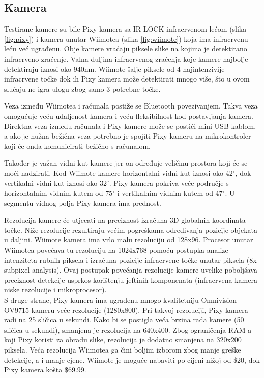 \documentclass[times, utf8, diplomski]{fer}
\begin{document}
\subsection{Kamera}
Testirane kamere su bile Pixy kamera sa IR-LOCK infracrvenom lećom (slika \ref{fig:pixy}) i kamera unutar Wiimotea (slika \ref{fig:wiimote}) koja ima infracrvenu leću već ugrađenu. Obje kamere vraćaju piksele slike na kojima je detektirano infracrveno zraćenje. Valna duljina infracrvenog zraćenja koje kamere najbolje detektiraju iznosi oko 940nm. Wiimote šalje piksele od 4 najintenzivije infracrvene točke dok ih Pixy kamera može detektirati mnogo više, što u ovom slučaju ne igra ulogu zbog samo 3 potrebne točke.

Veza između Wiimotea i računala postiže se Bluetooth povezivanjem. Takva veza omogućuje veću udaljenost kamera i veću fleksibilnost kod postavljanja kamera. Direktna veza između računala i Pixy kamere može se postići mini USB kablom, a ako je nužna bežična veza potrebno je spojiti Pixy kameru na mikrokontroler koji će onda komunicirati bežično s računalom.

Također je važan vidni kut kamere jer on određuje veličinu prostora koji će se moći nadzirati. Kod Wiimote kamere horizontalni vidni kut iznosi oko 42$^{\circ}$, dok vertikalni vidni kut iznosi oko 32$^{\circ}$. Pixy kamera pokriva veće područje s horizontalnim vidnim kutem od 75$^{\circ}$ i vertikalnim vidnim kutem od 47$^{\circ}$. U segmentu vidnog polja Pixy kamera ima prednost.

Rezolucija kamere će utjecati na preciznost izračuna 3D globalnih koordinata točke. Niže rezolucije rezultiraju većim pogreškama određivanja pozicije objekata u daljini. Wiimote kamera ima vrlo malu rezoluciju od 128x96. Procesor unutar Wiimotea povećava tu rezoluciju na 1024x768 pomoću postupka analize intenziteta rubnih piksela i izračuna pozicije infracrvene točke unutar piksela (8x subpixel analysis). Ovaj postupak povećanja rezolucije kamere uvelike poboljšava preciznost detekcije usprkos korištenju jeftinih komponenata (infracrvena kamera niske rezolucije i mikroprocesor).\\
S druge strane, Pixy kamera ima ugrađenu mnogo kvalitetniju Omnivision OV9715 kameru veće rezolucije (1280x800). Pri takvoj rezoluciji, Pixy kamera radi na 25 sličica u sekundi. Kako bi se postigla veća brzina rada kamere (50 sličica u sekundi), smanjena je rezolucija na 640x400. Zbog ograničenja RAM-a koji Pixy koristi za obradu slike, rezolucija je dodatno smanjena na 320x200 piksela. Veća rezolucija Wiimotea ga čini boljim izborom zbog manje greške detekcije, a i manje cjene. Wiimote je moguće nabaviti po cijeni nižoj od \$20, dok Pixy kamera košta \$69.99.
\end{document}
